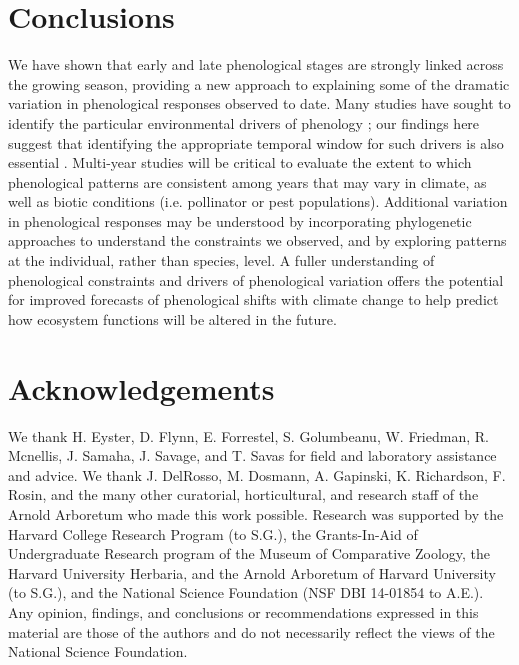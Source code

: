 \documentclass{article}
\begin{document}
\section* {Conclusions}
We have shown that early and late phenological stages are strongly linked across the growing season, providing a new approach to explaining some of the dramatic variation in phenological responses observed to date.  Many studies have sought to identify the particular environmental drivers of phenology \citep [e.g.][]{morin2010,schwartz2013}; our findings here suggest that identifying the appropriate temporal window for such drivers is also essential \citep{teller2016}.  
Multi-year studies will be critical to evaluate the extent to which phenological patterns are consistent among years that may vary in climate, as well as biotic conditions (i.e. pollinator or pest populations). Additional variation in phenological responses may be understood by incorporating phylogenetic approaches to understand the constraints we observed, and by exploring patterns at the individual, rather than species, level. A fuller understanding of phenological constraints and drivers of phenological variation offers the potential for improved forecasts of phenological shifts  with climate change to help predict how ecosystem functions will be altered in the future. %



\section*{Acknowledgements} %
We thank H. Eyster, D. Flynn, E. Forrestel, S. Golumbeanu, W. Friedman, R. Mcnellis, J. Samaha, J. Savage, and T. Savas for field and laboratory assistance and advice. We thank J. DelRosso, M. Dosmann, A. Gapinski, K. Richardson, F. Rosin, and the many other curatorial, horticultural, and research staff of the Arnold Arboretum who made this work possible. Research was supported by the Harvard College Research Program (to S.G.), the Grants-In-Aid of Undergraduate Research program of the Museum of Comparative Zoology, the Harvard University Herbaria, and the Arnold Arboretum of Harvard University (to S.G.), and the National Science Foundation (NSF DBI 14-01854 to A.E.). Any opinion, findings, and conclusions or recommendations expressed in this material are those of the authors and do not necessarily reflect the views of the National Science Foundation.
\end{document}

